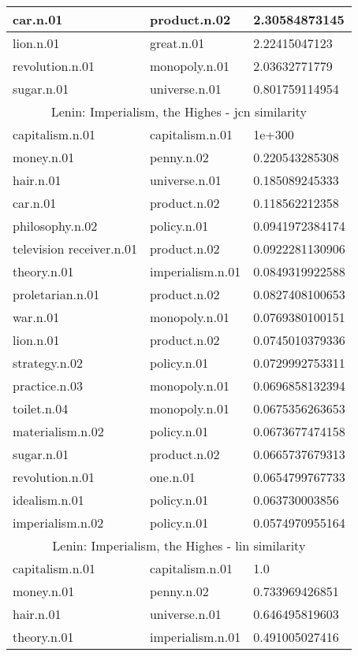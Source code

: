 \begin{center}
\begin{tabular}{ | l | l | l |}
car.n.01 & product.n.02 & 2.30584873145\\ \hline
lion.n.01 & great.n.01 & 2.22415047123\\ \hline
revolution.n.01 & monopoly.n.01 & 2.03632771779\\ \hline
sugar.n.01 & universe.n.01 & 0.801759114954\\ \hline
\multicolumn{3}{|c|}{Lenin: Imperialism, the Highes - jcn similarity} \\ \hline
capitalism.n.01 & capitalism.n.01 & 1e+300\\ \hline
money.n.01 & penny.n.02 & 0.220543285308\\ \hline
hair.n.01 & universe.n.01 & 0.185089245333\\ \hline
car.n.01 & product.n.02 & 0.118562212358\\ \hline
philosophy.n.02 & policy.n.01 & 0.0941972384174\\ \hline
television receiver.n.01 & product.n.02 & 0.0922281130906\\ \hline
theory.n.01 & imperialism.n.01 & 0.0849319922588\\ \hline
proletarian.n.01 & product.n.02 & 0.0827408100653\\ \hline
war.n.01 & monopoly.n.01 & 0.0769380100151\\ \hline
lion.n.01 & product.n.02 & 0.0745010379336\\ \hline
strategy.n.02 & policy.n.01 & 0.0729992753311\\ \hline
practice.n.03 & monopoly.n.01 & 0.0696858132394\\ \hline
toilet.n.04 & monopoly.n.01 & 0.0675356263653\\ \hline
materialism.n.02 & policy.n.01 & 0.0673677474158\\ \hline
sugar.n.01 & product.n.02 & 0.0665737679313\\ \hline
revolution.n.01 & one.n.01 & 0.0654799767733\\ \hline
idealism.n.01 & policy.n.01 & 0.063730003856\\ \hline
imperialism.n.02 & policy.n.01 & 0.0574970955164\\ \hline
\multicolumn{3}{|c|}{Lenin: Imperialism, the Highes - lin similarity} \\ \hline
capitalism.n.01 & capitalism.n.01 & 1.0\\ \hline
money.n.01 & penny.n.02 & 0.733969426851\\ \hline
hair.n.01 & universe.n.01 & 0.646495819603\\ \hline
theory.n.01 & imperialism.n.01 & 0.491005027416\\ \hline

\end{tabular}
\end{center}
